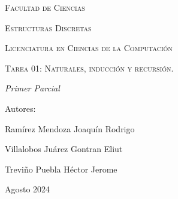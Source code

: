 \documentclass[oneside]{book}
\begin{document}
\begin{titlepage}
        \vspace{1cm}
        {\scshape\Large Facultad de Ciencias \par}
        \vspace{1cm}
        {\scshape\Large Estructuras Discretas \par}
        \vspace{1cm}
        {\scshape\Large Licenciatura en Ciencias de la Computación \par}
        \vspace{1cm}
        {\scshape\Huge Tarea 01: Naturales, inducción y recursión.  \par}
        \vspace{3cm}
        {\itshape\Large Primer Parcial \par}
        \vfill
        {\Large Autores: \par}
        {\Large Ramírez Mendoza Joaquín Rodrigo \par}
        {\Large Villalobos Juárez Gontran Eliut\par}
        {\Large Treviño Puebla Héctor Jerome \par}
        \vfill
        {\Large Agosto 2024 \par}
    \end{titlepage}
    \maketitle

\newpage
\newpage
\newpage
\newpage
\newpage
\newpage
\newpage
\newpage
\newpage
\newpage
\newpage

\newpage
\newpage
\newpage
\newpage
\end{document}
